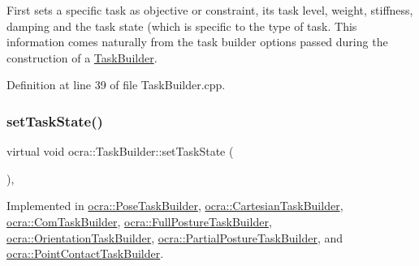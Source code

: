 First sets a specific task as objective or constraint, its task level, weight, stiffness, damping and the task state (which is specific to the type of task. This information comes naturally from the task builder options passed during the construction of a \hyperlink{classocra_1_1TaskBuilder}{Task\+Builder}. 

Definition at line 39 of file Task\+Builder.\+cpp.

\hypertarget{classocra_1_1TaskBuilder_a7b44bfa101566ea4400e2d9bfdb9ff32}{}\label{classocra_1_1TaskBuilder_a7b44bfa101566ea4400e2d9bfdb9ff32} 
\subsubsection{\texorpdfstring{set\+Task\+State()}{setTaskState()}}
{\footnotesize\ttfamily virtual void ocra\+::\+Task\+Builder\+::set\+Task\+State (\begin{DoxyParamCaption}{ }\end{DoxyParamCaption})\hspace{0.3cm}{\ttfamily [protected]}, {}}



Implemented in \hyperlink{classocra_1_1PoseTaskBuilder_a3bc6c07a3ee7656a1f3051500baddbd8}{ocra\+::\+Pose\+Task\+Builder}, \hyperlink{classocra_1_1CartesianTaskBuilder_a9e3175e5792c5ed9a7e3febbe458d21c}{ocra\+::\+Cartesian\+Task\+Builder}, \hyperlink{classocra_1_1ComTaskBuilder_ab514d4644f7dfeec3ae84a5b0b8bbc34}{ocra\+::\+Com\+Task\+Builder}, \hyperlink{classocra_1_1FullPostureTaskBuilder_a0f3852057b316baa402806fb320d257b}{ocra\+::\+Full\+Posture\+Task\+Builder}, \hyperlink{classocra_1_1OrientationTaskBuilder_ab30b211f4aa00ed4c78daae36aca6c42}{ocra\+::\+Orientation\+Task\+Builder}, \hyperlink{classocra_1_1PartialPostureTaskBuilder_a70b416b1666a772940d96338a317af0a}{ocra\+::\+Partial\+Posture\+Task\+Builder}, and \hyperlink{classocra_1_1PointContactTaskBuilder_a073506c0c849ad4ebd40aebef37f280d}{ocra\+::\+Point\+Contact\+Task\+Builder}.

\hypertarget{classocra_1_1TaskBuilder_a1a979fc495be6dc30483aa8fd0ff2650}{}\label{classocra_1_1TaskBuilder_a1a979fc495be6dc30483aa8fd0ff2650} 
